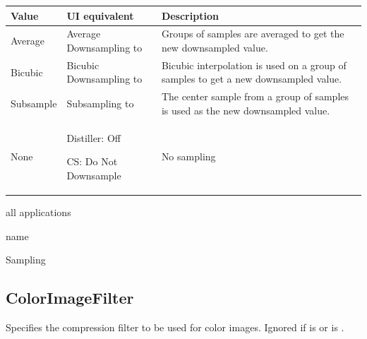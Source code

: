 \documentclass[letterpaper,12pt,english,openany,oneside]{sphinxmanual}
\begin{document}
\begin{savenotes}\sphinxattablestart
\centering
{}\label{\detokenize{PDF_Create_CommonSettings:section-4}}\nobreak
\begin{tabulary}{\linewidth}[t]{|T|T|T|}
\hline
\sphinxstyletheadfamily 
Value
&\sphinxstyletheadfamily 
UI equivalent
&\sphinxstyletheadfamily 
Description
\\
\hline
Average
&
Average Downsampling to
&
Groups of samples are averaged to get the new downsampled value.
\\
\hline
Bicubic
&
Bicubic Downsampling to
&
Bicubic interpolation is used on a group of samples to get a new downsampled value.
\\
\hline
Subsample
&
Subsampling to
&
The center sample from a group of samples is used as the new downsampled value.
\\
\hline
None
&
Distiller: Off

CS: Do Not Downsample
&
No sampling
\\
\hline
\end{tabulary}
\par
\sphinxattableend\end{savenotes}
\label{\detokenize{PDF_Create_CommonSettings:supported-by-24}}

all applications

\label{\detokenize{PDF_Create_CommonSettings:type-24}}

name

\label{\detokenize{PDF_Create_CommonSettings:ui-name-18}}

Sampling

\label{\detokenize{PDF_Create_CommonSettings:default-value-21}}

\begin{sphinxVerbatim}[commandchars=\\\{\}]
\end{sphinxVerbatim}




\subsection{ColorImageFilter}
\label{\detokenize{PDF_Create_CommonSettings:colorimagefilter}}
Specifies the compression filter to be used for color images. Ignored if  is  or  is  .
\end{document}
